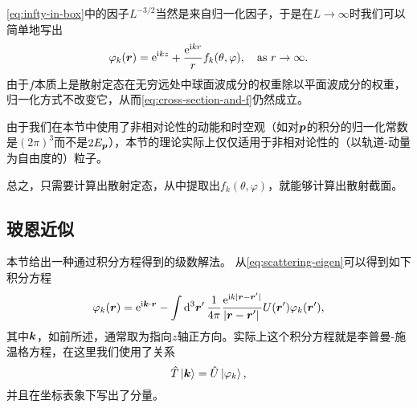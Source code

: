 \documentclass[UTF8, a4paper]{ctexart}
\newcommand*{\ee}{\mathrm{e}}
\newcommand*{\ii}{\mathrm{i}}
\begin{document}
\eqref{eq:infty-in-box}中的因子$L^{-3/2}$当然是来自归一化因子，于是在$L \to \infty$时我们可以简单地写出
\begin{equation}
    \varphi_k(\vb*{r}) = \ee^{\ii k z} + \frac{\ee^{\ii k r}}{r} f_k(\theta, \varphi) , \quad \text{as $r \to \infty$}.
    \label{eq:wave-function-k-f}
\end{equation}
由于$f$本质上是散射定态在无穷远处中球面波成分的权重除以平面波成分的权重，归一化方式不改变它，从而\eqref{eq:cross-section-and-f}仍然成立。

由于我们在本节中使用了非相对论性的动能和时空观（如对$\vb*{p}$的积分的归一化常数是$(2\pi)^3$而不是$2E_{\vb*{p}}$），本节的理论实际上仅仅适用于非相对论性的（以轨道-动量为自由度的）粒子。

总之，只需要计算出散射定态，从中提取出$f_k(\theta, \varphi)$，就能够计算出散射截面。

\subsection{玻恩近似}

本节给出一种通过积分方程得到的级数解法。
从\eqref{eq:scattering-eigen}可以得到如下积分方程
\begin{equation}
    \varphi_k(\vb*{r}) = \ee^{\ii \vb*{k} \cdot \vb*{r}} - \int \dd[3]{\vb*{r}'} \frac{1}{4\pi} \frac{\ee^{\ii k \abs*{\vb*{r} - \vb*{r}'}}}{\abs*{\vb*{r} - \vb*{r}'}} U(\vb*{r}') \varphi_k(\vb*{r}'),
    \label{eq:born-eq}
\end{equation}
其中$\vb*{k}$，如前所述，通常取为指向$z$轴正方向。实际上这个积分方程就是李普曼-施温格方程，在这里我们使用了关系
\[
    \hat{T} \ket*{\vb*{k}} = \hat{U} \ket*{\varphi_k},
\]
并且在坐标表象下写出了分量。
\end{document}
